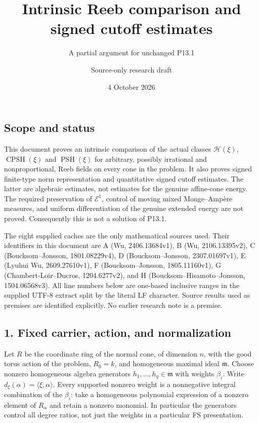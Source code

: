 \documentclass[
  11pt,
]{article}
\title{Intrinsic Reeb comparison and signed cutoff estimates}
\subtitle{A partial argument for unchanged P13.1}
\author{Source-only research draft}
\date{4 October 2026}
\begin{document}
\maketitle

\subsection{Scope and status}\label{scope-and-status}

This document proves an intrinsic comparison of the actual classes
\(\mathcal H(\xi)\), \(\operatorname{CPSH}(\xi)\) and
\(\operatorname{PSH}(\xi)\) for arbitrary, possibly irrational and
nonproportional, Reeb fields on every cone in the problem. It also
proves signed finite-type norm representation and quantitative signed
cutoff estimates. The latter are algebraic estimates, not estimates for
the genuine affine-cone energy. The required preservation of
\(\mathcal E^1\), control of moving mixed Monge--Ampère measures, and
uniform differentiation of the genuine extended energy are not proved.
Consequently this is not a solution of P13.1.

The eight supplied caches are the only mathematical sources used. Their
identifiers in this document are A (Wu, 2406.13684v1), B (Wu,
2106.13395v2), C (Boucksom--Jonsson, 1801.08229v4), D
(Boucksom--Jonsson, 2307.01697v1), E (Lyuhui Wu, 2609.27610v1), F
(Boucksom--Jonsson, 1805.11160v1), G (Chambert-Loir--Ducros,
1204.6277v2), and H (Boucksom--Hisamoto--Jonsson, 1504.06568v3). All
line numbers below are one-based inclusive ranges in the supplied UTF-8
extract split by the literal LF character. Source results used as
premises are identified explicitly. No earlier research note is a
premise.

\subsection{1. Fixed carrier, action, and
normalization}\label{fixed-carrier-action-and-normalization}

Let \(R\) be the coordinate ring of the normal cone, of dimension \(n\),
with the good torus action of the problem, \(R_0=k\), and homogeneous
maximal ideal \(\mathfrak m\). Choose nonzero homogeneous algebra
generators \(h_1,\ldots,h_q\in\mathfrak m\) with weights \(\beta_i\).
Write \(d_\xi(\alpha)=\langle\xi,\alpha\rangle\). Every supported
nonzero weight is a nonnegative integral combination of the \(\beta_i\):
take a homogeneous polynomial expression of a nonzero element of
\(R_\alpha\) and retain a nonzero monomial. In particular the generators
control all degree ratios, not just the weights in a particular FS
presentation.
\end{document}
